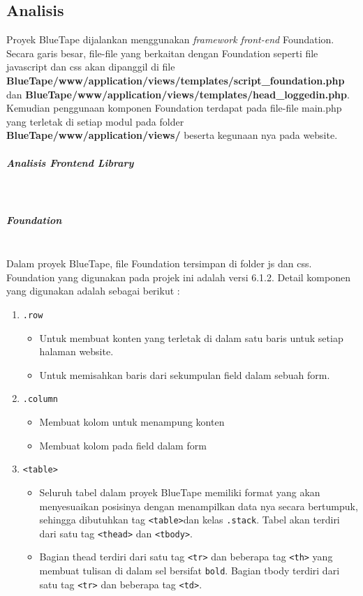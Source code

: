 \documentclass[a4paper,twoside]{article}
\newcommand{\myparagraph}[1]{\paragraph{#1}\mbox{}\\}
\begin{document}
\begin{enumerate}
		
		\chapter{Analisis}
		Proyek BlueTape dijalankan menggunakan \textit{framework front-end}  Foundation. Secara garis besar, file-file yang berkaitan dengan Foundation seperti file javascript dan css akan dipanggil di file \textbf{BlueTape/www/application/views/templates/script{\_}foundation.php} dan \textbf{BlueTape/www/application/views/templates/head{\_}loggedin.php}. Kemudian penggunaan komponen Foundation terdapat pada file-file main.php yang terletak di setiap modul pada folder \textbf{BlueTape/www/application/views/} beserta kegunaan nya pada website.
		\myparagraph{Analisis Frontend Library}
		\myparagraph{Foundation}
		Dalam proyek BlueTape, file Foundation tersimpan di folder js dan css. Foundation yang digunakan pada projek ini adalah versi 6.1.2. Detail komponen yang digunakan adalah sebagai berikut :
		\begin{enumerate}
			\item \colorbox{mygray}{\texttt{.row}}
			\begin{itemize}
				\item Untuk membuat konten yang terletak di dalam satu baris untuk setiap halaman website.
				\item Untuk memisahkan baris dari sekumpulan field dalam sebuah form.
			\end{itemize}
			\item \colorbox{mygray}{\texttt{.column}}
			\begin{itemize}
				\item Membuat kolom untuk menampung konten
				\item Membuat kolom pada field dalam form
			\end{itemize}	
			\item \colorbox{mygray}{\texttt{<table>}}  \par
			\begin{itemize}
				\item 	Seluruh tabel dalam proyek BlueTape memiliki format yang akan menyesuaikan posisinya dengan menampilkan data nya secara bertumpuk, sehingga dibutuhkan tag \colorbox{mygray}{\texttt{<table>}}dan kelas \colorbox{mygray}{\texttt{.stack}}. Tabel akan terdiri dari satu tag \colorbox{mygray}{\texttt{<thead>}} dan \colorbox{mygray}{\texttt{<tbody>}}.
				\item Bagian thead terdiri dari satu tag \colorbox{mygray}{\texttt{<tr>}} dan beberapa tag \colorbox{mygray}{\texttt{<th>}} yang membuat tulisan di dalam sel bersifat \texttt{bold}. Bagian tbody terdiri dari satu tag \colorbox{mygray}{\texttt{<tr>}} dan beberapa tag \colorbox{mygray}{\texttt{<td>}}. 

\end{itemize}
\end{enumerate}
\end{enumerate}
\end{document}
